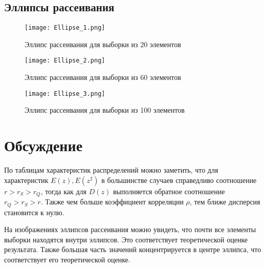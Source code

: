 \documentclass[12pt,a4paper]{article}
\begin{document}
\subsection{Эллипсы рассеивания}
\begin{figure}[H]
    \centering
    \texttt{[image: Ellipse\_1.png]}
    \caption{Эллипс рассеивания для выборки из 20 элементов}
\end{figure}

\begin{figure}[H]
    \centering
    \texttt{[image: Ellipse\_2.png]}
    \caption{Эллипс рассеивания для выборки из 60 элементов}
\end{figure}

\begin{figure}[H]
    \centering
    \texttt{[image: Ellipse\_3.png]}
    \caption{Эллипс рассеивания для выборки из 100 элементов}
\end{figure}

\section{Обсуждение}
По таблицам характеристик распределений можно заметить, что для характеристик $E(z),E(z^2)$ в большинстве случаев справедливо соотношение $r > r_S > r_Q$, тогда как для $D(z)$ выполняется обратное соотношение $r_Q > r_S > r$. Также чем больше коэффициент корреляции $\rho$, тем ближе дисперсия становится к нулю.

На изображениях эллипсов рассеивания можно увидеть, что почти все элементы выборки находятся внутри эллипсов. Это соответствует теоретической оценке результата. Также большая часть значений концентрируется в центре эллипса, что соответствует его теоретической оценке.
\end{document}
